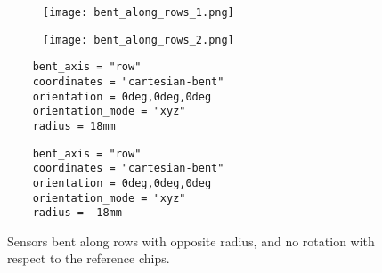     
    
    \begin{figure}[!htp]
    \centering
    \begin{subfigure}{.45\textwidth}
      \centering
      \texttt{[image: bent\_along\_rows\_1.png]}
      \caption{}
      \label{fig:upstream}
    \end{subfigure}%
    \begin{subfigure}{.45\textwidth}
      \centering
      \texttt{[image: bent\_along\_rows\_2.png]}
      \caption{}
      \label{fig:downstream}
    \end{subfigure}
    \begin{multicols}{2}
    \begin{verbatim}
    bent_axis = "row"
    coordinates = "cartesian-bent"
    orientation = 0deg,0deg,0deg
    orientation_mode = "xyz"
    radius = 18mm
    \end{verbatim}
    \begin{verbatim}
    bent_axis = "row"
    coordinates = "cartesian-bent"
    orientation = 0deg,0deg,0deg
    orientation_mode = "xyz"
    radius = -18mm
    \end{verbatim}
    \end{multicols}
    \caption{Sensors bent along rows with opposite radius, \protect{} and no rotation with respect to the reference chips.}
    \label{fig:rotated_sensors_along_rows}
    \end{figure}
    
    
    
